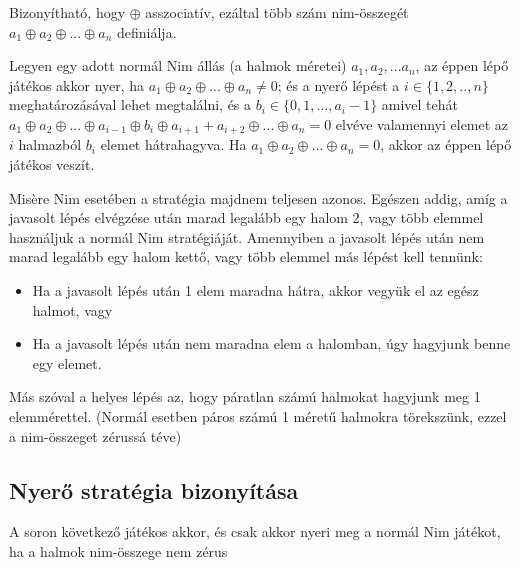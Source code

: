 Bizonyítható, hogy $\oplus$ asszociatív, ezáltal több szám nim-összegét $a_1 \oplus a_2 \oplus ... \oplus a_n$ definiálja. \ujsor

Legyen egy adott normál Nim állás (a halmok méretei) $a_1, a_2, ... a_n$, az éppen lépő játékos akkor nyer, ha $a_1 \oplus a_2 \oplus ... \oplus a_n \neq 0$; és a nyerő lépést a $i \in \{1, 2, .., n\}$ meghatározásával lehet megtalálni, és a $b_i \in \{0, 1, ..., a_i -1\}$ amivel tehát $a_1 \oplus a_2 \oplus ... \oplus a_{i-1} \oplus b_i \oplus a_{i+1} + a_{i+2} \oplus ... \oplus a_n = 0$ elvéve valamennyi elemet az $i$ halmazból $b_i$ elemet hátrahagyva. Ha $a_1 \oplus a_2 \oplus ... \oplus a_n = 0$, akkor az éppen lépő játékos veszít. \ujsor

Misère Nim esetében a stratégia majdnem teljesen azonos. Egészen addig, amíg a javasolt lépés elvégzése után marad legalább egy halom 2, vagy több elemmel használjuk a normál Nim stratégiáját. Amennyiben a javasolt lépés után nem marad legalább egy halom kettő, vagy több elemmel más lépést kell tennünk:
\begin{itemize}
	\item Ha a javasolt lépés után 1 elem maradna hátra, akkor vegyük el az egész halmot, vagy
	\item Ha a javasolt lépés után nem maradna elem a halomban, úgy hagyjunk benne egy elemet.
\end{itemize}
Más szóval a helyes lépés az, hogy páratlan számú halmokat hagyjunk meg 1 elemmérettel. (Normál esetben páros számú 1 méretű halmokra törekszünk, ezzel a nim-összeget zérussá téve) 


\subsection{Nyerő stratégia bizonyítása}
\begin{theorem}
	A soron következő játékos akkor, és csak akkor nyeri meg a normál Nim játékot, ha a halmok nim-összege nem zérus
\end{theorem}

